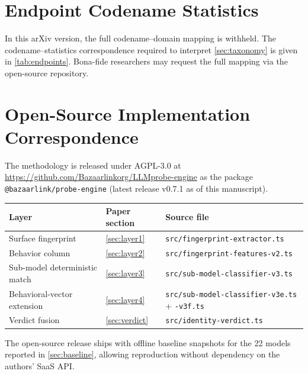 \documentclass[10pt,a4paper,twocolumn]{article}
\begin{document}
\section{Endpoint Codename Statistics}

In this arXiv version, the full codename--domain mapping is withheld. The
codename--statistics correspondence required to interpret \cref{sec:taxonomy}
is given in \cref{tab:endpoints}. Bona-fide researchers may request the full
mapping via the open-source repository.

\section{Open-Source Implementation Correspondence}\label{app:opensource}

The methodology is released under AGPL-3.0 at
\url{https://github.com/Bazaarlinkorg/LLMprobe-engine} as the package
\texttt{@bazaarlink/probe-engine} (latest release v0.7.1 as of this manuscript).

\begin{table}[h]
\centering
\small
\begin{tabular}{@{}lll@{}}
\toprule
Layer & Paper section & Source file \\
\midrule
Surface fingerprint & \cref{sec:layer1} & \texttt{src/fingerprint-extractor.ts} \\
Behavior column & \cref{sec:layer2} & \texttt{src/fingerprint-features-v2.ts} \\
Sub-model deterministic match & \cref{sec:layer3} & \texttt{src/sub-model-classifier-v3.ts} \\
Behavioral-vector extension & \cref{sec:layer4} & \texttt{src/sub-model-classifier-v3e.ts} + \texttt{-v3f.ts} \\
Verdict fusion & \cref{sec:verdict} & \texttt{src/identity-verdict.ts} \\
\bottomrule
\end{tabular}
\end{table}

The open-source release ships with offline baseline snapshots for the 22
models reported in \cref{sec:baseline}, allowing reproduction without
dependency on the authors' SaaS API.
\end{document}
